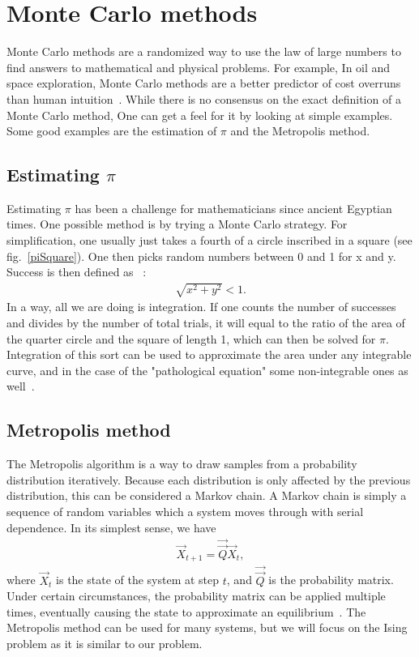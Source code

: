 \section{Monte Carlo methods}
Monte Carlo methods are a randomized way to use the law of large numbers to find answers to mathematical and physical problems. For example, In oil and space exploration, Monte Carlo methods are a better predictor of cost overruns than human intuition~\cite{Hubbard09}. While there is no consensus on the exact definition of a Monte Carlo method, One can get a feel for it by looking at simple examples. Some good examples are the estimation of $\pi$ and the Metropolis method. 

\subsection{Estimating $\pi$}
Estimating $\pi$ has been a challenge for mathematicians since ancient Egyptian times. One possible method is by trying a Monte Carlo strategy. For simplification, one usually just takes a fourth of a circle inscribed in a square (see fig.~\ref{piSquare}). One then picks random numbers between 0 and 1 for x and y. Success is then defined as ~\cite{Kalos08}:
\begin{eqnarray}
\sqrt{x^2 + y^2} < 1 .
\label{piSuccess}
\end{eqnarray}
In a way, all we are doing is integration. If one counts the number of successes and divides by the number of total trials, it will equal to the ratio of the area of the quarter circle and the square of length 1, which can then be solved for $\pi$. Integration of this sort can be used to approximate the area under any integrable curve, and in the case of the "pathological equation" some non-integrable ones as well~\cite{Newmann99}. 

\subsection{Metropolis method}
The Metropolis algorithm is a way to draw samples from a probability distribution iteratively. Because each distribution is only affected by the previous distribution, this can be considered a Markov chain. A Markov chain is simply a sequence of random variables which a system moves through with serial dependence. In its simplest sense, we have
\begin{eqnarray}
\overrightarrow X_{t+1} = \overrightarrow{ \overrightarrow Q} \overrightarrow X_{t} ,
\label{Markov}
\end{eqnarray}
where $\overrightarrow X_t$ is the state of the system at step $t$, and $\overrightarrow{\overrightarrow Q}$ is the probability matrix. Under certain circumstances, the probability matrix can be applied multiple times, eventually causing the state to approximate an equilibrium~\cite{Everitt02}. The Metropolis method can be used for many systems, but we will focus on the Ising problem as it is similar to our problem.

